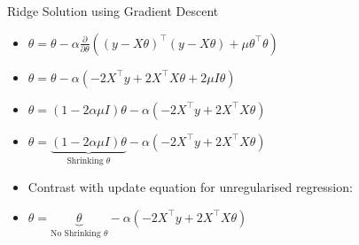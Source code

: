 \documentclass{beamer}
\begin{document}
\begin{frame}{Ridge Solution using Gradient Descent}
\begin{itemize}[<+->]
	\item \(\theta=\theta - \alpha \frac{\partial}{\partial \theta}(\left(y-X\theta\right)^{\top}\left(y-X\theta\right)+\mu\theta^{\top}\theta)\) 
	\item \(\theta=\theta - \alpha(-2 X^{\top} y+2 X^{\top} X \theta + 2\mu I \theta)\)
	\item \(\theta=(1-2\alpha\mu I)\theta - \alpha(-2 X^{\top} y+2 X^{\top} X \theta)\)
	\item \(\theta=\underbrace{(1-2\alpha\mu I)\theta}_\text{Shrinking $\theta$} - \alpha(-2 X^{\top} y+2 X^{\top} X \theta)\)
\end{itemize}
\pause \begin{itemize}

	\item Contrast with update equation for unregularised regression:
	\item \(\theta=\underbrace{\theta}_\text{No Shrinking $\theta$} - \alpha(-2 X^{\top} y+2 X^{\top} X \theta)\)
	
\end{itemize}

\end{frame}

{
	
}
\end{document}
